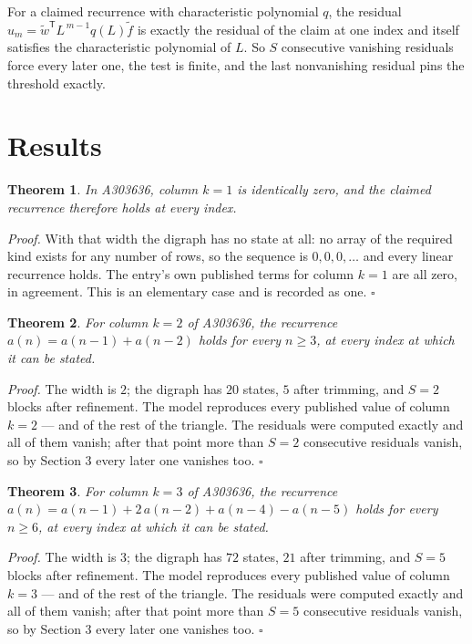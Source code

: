 \documentclass[11pt]{article}
\newtheorem{theorem}{Theorem}
\theoremstyle{definition}
\begin{document}
For a claimed recurrence with characteristic polynomial $q$, the residual $u_m = \tilde w^{\mathsf T}L^{\,m-1}q(L)\tilde f$ is exactly the residual of the claim at one index and itself satisfies the characteristic polynomial of $L$. So $S$ consecutive vanishing residuals force every later one, the test is finite, and the last nonvanishing residual pins the threshold exactly.

\section{Results}

\begin{theorem} In A303636, column $k = 1$ is identically zero, and the claimed recurrence therefore holds at every index.\end{theorem}

{\itshape Proof.} With that width the digraph has no state at all: no array of the required kind exists for any number of rows, so the sequence is $0,0,0,\dots$ and every linear recurrence holds. The entry's own published terms for column $k = 1$ are all zero, in agreement. This is an elementary case and is recorded as one. $\square$

\begin{theorem} For column $k = 2$ of A303636, the recurrence $a(n) = a(n-1) + a(n-2)$ holds for every $n \ge 3$, at every index at which it can be stated.\end{theorem}

{\itshape Proof.} The width is $2$; the digraph has $20$ states, $5$ after trimming, and $S = 2$ blocks after refinement. The model reproduces every published value of column $k = 2$ --- and of the rest of the triangle. The residuals were computed exactly and all of them vanish; after that point more than $S = 2$ consecutive residuals vanish, so by Section 3 every later one vanishes too. $\square$

\begin{theorem} For column $k = 3$ of A303636, the recurrence $a(n) = a(n-1) + 2\,a(n-2) + a(n-4) - a(n-5)$ holds for every $n \ge 6$, at every index at which it can be stated.\end{theorem}

{\itshape Proof.} The width is $3$; the digraph has $72$ states, $21$ after trimming, and $S = 5$ blocks after refinement. The model reproduces every published value of column $k = 3$ --- and of the rest of the triangle. The residuals were computed exactly and all of them vanish; after that point more than $S = 5$ consecutive residuals vanish, so by Section 3 every later one vanishes too. $\square$
\end{document}
